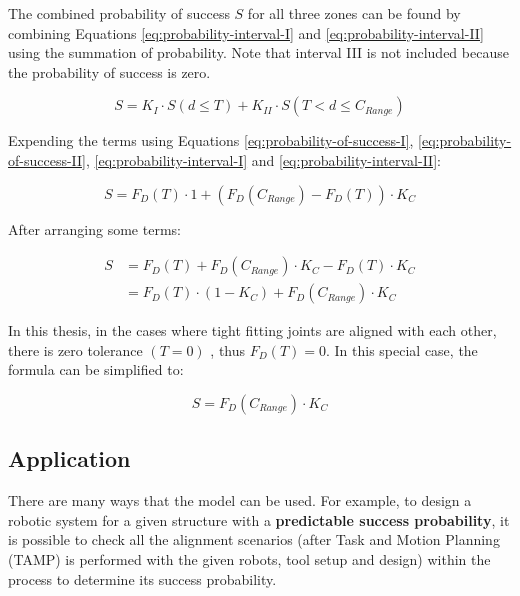 The combined probability of success $S$ for all three zones can be found by combining Equations \ref{eq:probability-interval-I} and \ref{eq:probability-interval-II} using the summation of probability. Note that interval \textrm{III} is not included because the probability of success is zero.

\begin{equation} \label{eq:probability-of-three-intervals}
    S = K_I \cdot S(d \le T) + K_{II} \cdot S(T < d \le C_{Range})   
\end{equation}

Expending the terms using Equations \ref{eq:probability-of-success-I}, \ref{eq:probability-of-success-II}, \ref{eq:probability-interval-I} and \ref{eq:probability-interval-II}:

\begin{equation} \label{eq:probability-expanded}
    S = F_D(T) \cdot 1 + (F_D (C_{Range}) - F_D(T)) \cdot K_C
\end{equation}

After arranging some terms:

\begin{align} \label{eq:probability-expanded-rearranged}
    S &= F_D(T) + F_D (C_{Range}) \cdot K_C - F_D(T) \cdot K_C \nonumber \\
      &= F_D(T) \cdot (1 - K_C) + F_D(C_{Range}) \cdot K_C 
\end{align}

In this thesis, in the cases where tight fitting joints are aligned with each other, there is zero tolerance $(T = 0)$ , thus $F_D(T) = 0$. In this special case, the formula can be simplified to:

\begin{equation} \label{eq:probability-when-zero-tolerance}
    S = F_D(C_{Range}) \cdot K_C 
\end{equation}

\subsection{Application}
\label{subsection:new-hypo-model-application}

There are many ways that the model can be used. For example, to design a robotic system for a given structure with a \textbf{predictable success probability}, it is possible to check all the alignment scenarios (after Task and Motion Planning (TAMP) is performed with the given robots, tool setup and design) within the process to determine its success probability. 

